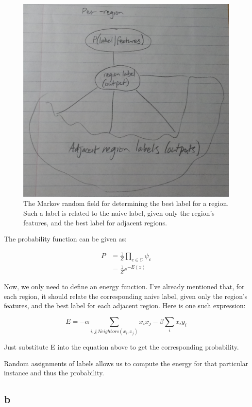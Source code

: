 \documentclass{article}
\begin{document}
\begin{figure}[!ht]
	\centering
	\includegraphics[width=120mm]{figs/region-by-noun-mrf.jpg}
	\caption{The Markov random field for determining the best label for a 
        region. Such a label is related to the naive label, given only the 
        region's features, and the best label for adjacent regions.}
\end{figure}

The probability function can be given as:

\begin{align*}
P &= \frac{1}{Z} \prod_{c \in C} \psi_c \\
 &= \frac{1}{Z} e^{-E(x)}
\end{align*}

Now, we only need to define an energy function. I've already mentioned that, for 
each region, it should relate the corresponding naive label, given only the 
region's features, and the best label for each adjacent region. Here is one 
such expression:

$$
E = - \alpha \sum_{i, j | Neighbors(x_i, x_j)} x_i x_j - \beta \sum_{i} x_i y_i
$$

Just substitute E into the equation above to get the corresponding probability.

Random assignments of labels allows us to compute the energy for that particular 
instance and thus the probability.

\subsection{b}
\end{document}
